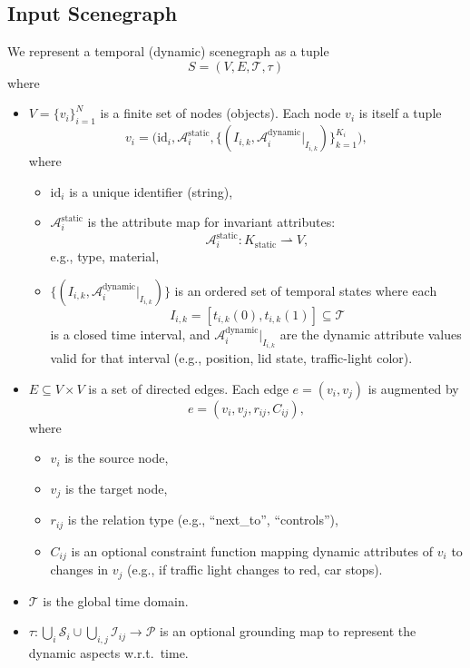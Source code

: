 \documentclass{article}
\begin{document}
\subsection{Input Scenegraph}
We represent a temporal (dynamic) scenegraph as a tuple
\begin{equation}
S = (V, E, \mathcal{T}, \tau)
\end{equation}
where
\begin{itemize}
    \item $V = \{v_i\}_{i=1}^N$ is a finite set of nodes (objects). Each node $v_i$ is itself a tuple
    \begin{equation}
        v_i = \big(\mathrm{id}_i, \mathcal{A}_i^{\mathrm{static}}, \{(I_{i,k}, \mathcal{A}_i^{\mathrm{dynamic}}|_{I_{i,k}})\}_{k=1}^{K_i} \big),
    \end{equation}
    where
    \begin{itemize}
        \item $\mathrm{id}_i$ is a unique identifier (string),
        \item $\mathcal{A}_i^{\mathrm{static}}$ is the attribute map for invariant attributes:
        \[
        \mathcal{A}_i^{\mathrm{static}} : K_\mathrm{static} \rightharpoonup V,
        \]
        e.g., type, material,
        \item $\{(I_{i,k}, \mathcal{A}_i^{\mathrm{dynamic}}|_{I_{i,k}})\}$ is an ordered set of temporal states where each
        \[
        I_{i,k} = [t_{i,k}(0), t_{i,k}(1)] \subseteq \mathcal{T}
        \]
        is a closed time interval, and $\mathcal{A}_i^{\mathrm{dynamic}}|_{I_{i,k}}$ are the dynamic attribute values valid for that interval (e.g., position, lid state, traffic-light color).
    \end{itemize}
    \item $E \subseteq V \times V$ is a set of directed edges. Each edge $e = (v_i, v_j)$ is augmented by
    \begin{equation}
        e = (v_i, v_j, r_{ij}, C_{ij}),
    \end{equation}
    where
    \begin{itemize}
        \item $v_i$ is the source node,
        \item $v_j$ is the target node,
        \item $r_{ij}$ is the relation type (e.g., ``next\_to'', ``controls''),
        \item $C_{ij}$ is an optional constraint function mapping dynamic attributes of $v_i$ to changes in $v_j$ (e.g., if traffic light changes to red, car stops).
    \end{itemize}
    \item $\mathcal{T}$ is the global time domain.
    \item $\tau: \bigcup_i \mathcal{S}_i \cup \bigcup_{i,j} \mathcal{I}_{ij} \to \mathcal{P}$ is an optional grounding map to represent the dynamic aspects w.r.t.\ time.
\end{itemize}
\end{document}
